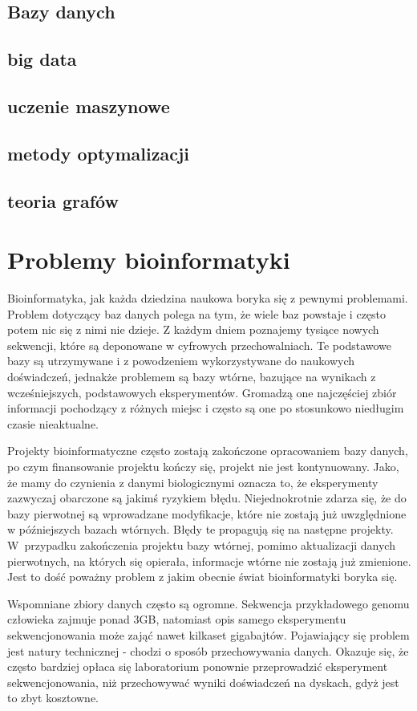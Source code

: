 \subsection{Bazy danych}
\subsection{big data}
\subsection{uczenie maszynowe}
\subsection{metody optymalizacji}
\subsection{teoria grafów}

\section{Problemy bioinformatyki}
Bioinformatyka, jak każda dziedzina naukowa boryka się z pewnymi problemami. Problem dotyczący baz danych polega na tym, że wiele baz powstaje i często potem nic się z nimi nie dzieje. Z każdym dniem poznajemy tysiące nowych sekwencji, które są deponowane w cyfrowych przechowalniach. Te podstawowe bazy są utrzymywane i z powodzeniem wykorzystywane do naukowych doświadczeń, jednakże problemem są bazy wtórne, bazujące na wynikach z wcześniejszych, podstawowych eksperymentów. Gromadzą one najczęściej zbiór informacji pochodzący z różnych miejsc i często są one po stosunkowo niedługim czasie nieaktualne.

Projekty bioinformatyczne często zostają zakończone opracowaniem bazy danych, po czym finansowanie projektu kończy się, projekt nie jest kontynuowany.
Jako, że mamy do czynienia z danymi biologicznymi oznacza to, że eksperymenty zazwyczaj obarczone są jakimś ryzykiem błędu. Niejednokrotnie zdarza się, że do bazy pierwotnej są wprowadzane modyfikacje, które nie zostają już uwzględnione w późniejszych bazach wtórnych. Błędy te propagują się na następne projekty. W~przypadku zakończenia projektu bazy wtórnej, pomimo aktualizacji danych pierwotnych, na których się opierała, informacje wtórne nie zostają już zmienione. Jest to dość poważny problem z jakim obecnie świat bioinformatyki boryka się.

Wspomniane zbiory danych często są ogromne. Sekwencja przykładowego genomu człowieka zajmuje ponad 3GB, natomiast opis samego eksperymentu sekwencjonowania może zająć nawet kilkaset gigabajtów. Pojawiający się problem jest natury technicznej - chodzi o sposób przechowywania danych. Okazuje się, że często bardziej opłaca się laboratorium ponownie przeprowadzić eksperyment sekwencjonowania, niż przechowywać wyniki doświadczeń na dyskach, gdyż jest to zbyt kosztowne. 


